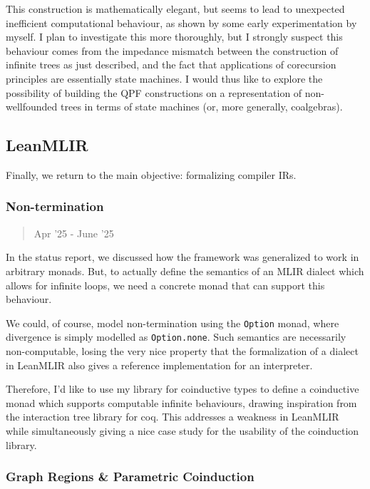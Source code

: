 \documentclass[a4paper]{scrartcl}
\begin{document}
This construction is mathematically elegant, but seems to lead to
unexpected inefficient computational behaviour, as shown by some early
experimentation by myself. I plan to investigate this more thoroughly,
but I strongly suspect this behaviour comes from the impedance mismatch
between the construction of infinite trees as just described, and the
fact that applications of corecursion principles are essentially state
machines. I would thus like to explore the possibility of building the
QPF constructions on a representation of non-wellfounded trees in terms
of state machines (or, more generally, coalgebras).



\subsection{LeanMLIR}\label{leanmlir}

Finally, we return to the main objective: formalizing compiler IRs.


\subsubsection{Non-termination}\label{non-termination}

\begin{quote}
Apr '25 - June '25
\end{quote}

In the status report, we discussed how the framework was generalized to
work in arbitrary monads. But, to actually define the semantics of an
MLIR dialect which allows for infinite loops, we need a concrete monad
that can support this behaviour.

We could, of course, model non-termination using the \texttt{Option}
monad, where divergence is simply modelled as \texttt{Option.none}. Such
semantics are necessarily non-computable, losing the very nice property
that the formalization of a dialect in LeanMLIR also gives a reference
implementation for an interpreter.

Therefore, I'd like to use my library for coinductive types to define a
coinductive monad which supports computable infinite behaviours, drawing
inspiration from the interaction tree library for coq.
\cite{xiaInteractionTreesRepresenting2020} This addresses a
weakness in LeanMLIR while simultaneously giving a nice case study for
the usability of the coinduction library.



\subsubsection{Graph Regions \& Parametric
Coinduction}\label{graph-regions-parametric-coinduction}
\end{document}
